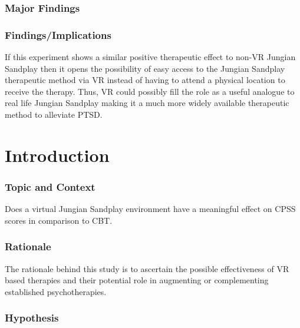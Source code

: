 \documentclass[
]{article}
\begin{document}
\hypertarget{major-findings}{%
\subsubsection{\texorpdfstring{\textbf{Major
Findings}}{Major Findings}}\label{major-findings}}

\hypertarget{findingsimplications}{%
\subsubsection{\texorpdfstring{\textbf{Findings/Implications}}{Findings/Implications}}\label{findingsimplications}}

If this experiment shows a similar positive therapeutic effect to non-VR
Jungian Sandplay then it opens the possibility of easy access to the
Jungian Sandplay therapeutic method via VR instead of having to attend a
physical location to receive the therapy. Thus, VR could possibly fill
the role as a useful analogue to real life Jungian Sandplay making it a
much more widely available therapeutic method to alleviate PTSD.

\hypertarget{introduction-1}{%
\section{Introduction}\label{introduction-1}}

\hypertarget{topic-and-context}{%
\subsubsection{\texorpdfstring{\textbf{Topic and
Context}}{Topic and Context}}\label{topic-and-context}}

Does a virtual Jungian Sandplay environment have a meaningful effect on
CPSS scores in comparison to CBT.

\hypertarget{rationale}{%
\subsubsection{\texorpdfstring{\textbf{Rationale}}{Rationale}}\label{rationale}}

The rationale behind this study is to ascertain the possible
effectiveness of VR based therapies and their potential role in
augmenting or complementing established psychotherapies.

\hypertarget{hypothesis}{%
\subsubsection{\texorpdfstring{\textbf{Hypothesis}}{Hypothesis}}\label{hypothesis}}
\end{document}
